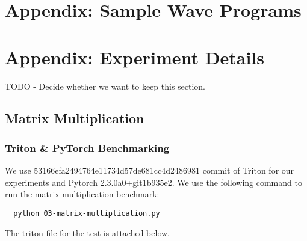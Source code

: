 \documentclass{article}
\begin{document}
\section{Appendix: Sample Wave Programs}
\label{section:samples}

\section{Appendix: Experiment Details}
TODO - Decide whether we want to keep this section.
\label{section:details}
\subsection{Matrix Multiplication}
\subsubsection{Triton \& PyTorch Benchmarking}
We use 53166efa2494764e11734d57de681cc4d2486981 commit of Triton for our experiments and Pytorch 2.3.0a0+git1b935e2. We use the following command to run the matrix multiplication benchmark:
\begin{lstlisting}
  python 03-matrix-multiplication.py
\end{lstlisting}
The triton file for the test is attached below.
\end{document}
